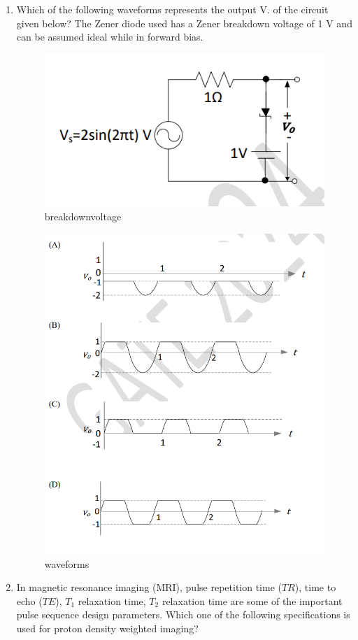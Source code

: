 \documentclass[journal,12pt,onecolumn]{IEEEtran}
\theoremstyle{remark}
\begin{document}
\begin{enumerate}
\item Which of the following waveforms represents the output V. of the circuit given
below? The Zener diode used has a Zener breakdown voltage of 1 V and can be
assumed ideal while in forward bias.
\begin{figure}[H]
\centering
\includegraphics[width=0.6\columnwidth]{Figs/Fig 6.png}
\caption{breakdownvoltage}
\label{fig:placeholder}
\end{figure}
\begin{figure}[H]
\centering
\includegraphics[width=0.8\columnwidth]{Figs/Fig 7.png}
\caption{waveforms}
\label{fig:placeholder}
\end{figure}

\item In magnetic resonance imaging (MRI), pulse repetition time ($TR$), time to echo ($TE$), $T_1$ relaxation time, $T_2$ relaxation time are some of the important pulse sequence design parameters. Which one of the following specifications is used for proton density weighted imaging?


\end{enumerate}
\end{document}
